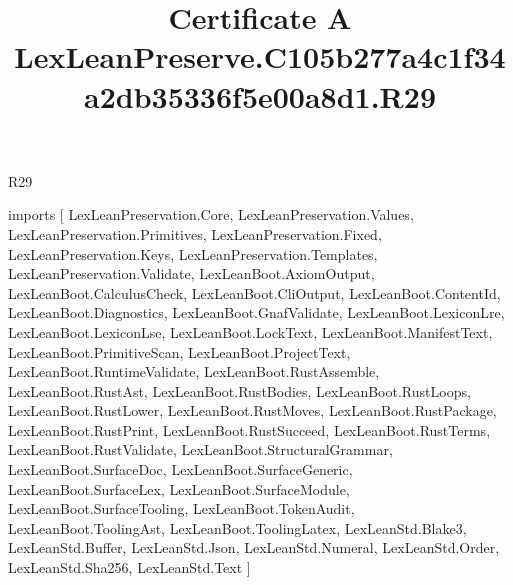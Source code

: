 \begin{lexlean}{R29}
\title{Certificate A LexLeanPreserve.C105b277a4c1f34a2db35336f5e00a8d1.R29}
\begin{coremodule}
imports [
  LexLeanPreservation.Core,
  LexLeanPreservation.Values,
  LexLeanPreservation.Primitives,
  LexLeanPreservation.Fixed,
  LexLeanPreservation.Keys,
  LexLeanPreservation.Templates,
  LexLeanPreservation.Validate,
  LexLeanBoot.AxiomOutput,
  LexLeanBoot.CalculusCheck,
  LexLeanBoot.CliOutput,
  LexLeanBoot.ContentId,
  LexLeanBoot.Diagnostics,
  LexLeanBoot.GnafValidate,
  LexLeanBoot.LexiconLre,
  LexLeanBoot.LexiconLse,
  LexLeanBoot.LockText,
  LexLeanBoot.ManifestText,
  LexLeanBoot.PrimitiveScan,
  LexLeanBoot.ProjectText,
  LexLeanBoot.RuntimeValidate,
  LexLeanBoot.RustAssemble,
  LexLeanBoot.RustAst,
  LexLeanBoot.RustBodies,
  LexLeanBoot.RustLoops,
  LexLeanBoot.RustLower,
  LexLeanBoot.RustMoves,
  LexLeanBoot.RustPackage,
  LexLeanBoot.RustPrint,
  LexLeanBoot.RustSucceed,
  LexLeanBoot.RustTerms,
  LexLeanBoot.RustValidate,
  LexLeanBoot.StructuralGrammar,
  LexLeanBoot.SurfaceDoc,
  LexLeanBoot.SurfaceGeneric,
  LexLeanBoot.SurfaceLex,
  LexLeanBoot.SurfaceModule,
  LexLeanBoot.SurfaceTooling,
  LexLeanBoot.TokenAudit,
  LexLeanBoot.ToolingAst,
  LexLeanBoot.ToolingLatex,
  LexLeanStd.Blake3,
  LexLeanStd.Buffer,
  LexLeanStd.Json,
  LexLeanStd.Numeral,
  LexLeanStd.Order,
  LexLeanStd.Sha256,
  LexLeanStd.Text
]


\end{coremodule}
\end{lexlean}
